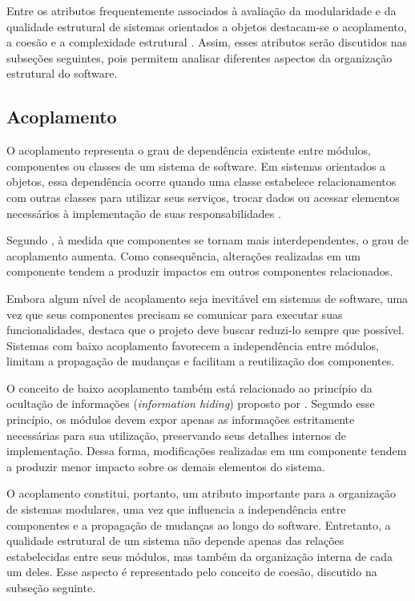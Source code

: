 Entre os atributos frequentemente associados à avaliação da modularidade e da qualidade estrutural de sistemas orientados a objetos 
destacam-se o acoplamento, a coesão e a complexidade estrutural \cite{pressman2010,fenton2015}. Assim, esses atributos serão discutidos
nas subseções seguintes, pois permitem analisar diferentes aspectos da organização estrutural do software.

\subsection{Acoplamento}
\label{sec:acoplamento}

O acoplamento representa o grau de dependência existente entre módulos, componentes ou classes de um sistema de software. 
Em sistemas orientados a objetos, essa dependência ocorre quando uma classe estabelece relacionamentos com outras classes para 
utilizar seus serviços, trocar dados ou acessar elementos necessários à implementação de suas responsabilidades \cite{pressman2010}.

Segundo , à medida que componentes se tornam mais interdependentes, o grau de acoplamento aumenta. 
Como consequência, alterações realizadas em um componente tendem a produzir impactos em outros componentes relacionados.

Embora algum nível de acoplamento seja inevitável em sistemas de software, uma vez que seus componentes precisam se comunicar 
para executar suas funcionalidades,  destaca que o projeto deve buscar reduzi-lo sempre que possível. 
Sistemas com baixo acoplamento favorecem a independência entre módulos, limitam a propagação de mudanças e facilitam a reutilização
dos componentes.

O conceito de baixo acoplamento também está relacionado ao princípio da ocultação de informações (\textit{information hiding}) proposto 
por . Segundo esse princípio, os módulos devem expor apenas as informações estritamente necessárias para sua 
utilização, preservando seus detalhes internos de implementação. Dessa forma, modificações realizadas em um componente tendem a produzir 
menor impacto sobre os demais elementos do sistema.

O acoplamento constitui, portanto, um atributo importante para a organização de sistemas modulares, uma vez que influencia a independência
entre componentes e a propagação de mudanças ao longo do software. Entretanto, a qualidade estrutural de um sistema não depende apenas
das relações estabelecidas entre seus módulos, mas também da organização interna de cada um deles. Esse aspecto é representado pelo 
conceito de coesão, discutido na subseção seguinte.

